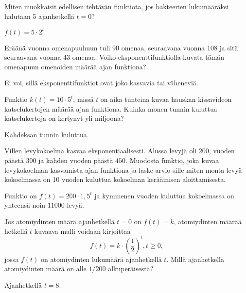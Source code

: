\begin{tehtavasivu}
\begin{tehtava}
Miten muokkaisit edellisen tehtävän funktiota, jos bakteerien lukumääräksi
halutaan 5 ajanhetkellä $t = 0$?
\begin{vastaus}
$f(t) = 5 \cdot 2^t$
\end{vastaus}
\end{tehtava}

\begin{tehtava}
Eräänä vuonna omenapuuhuun tuli 90 omenaa, seuraavana vuonna 108 ja sitä seuraavana vuonna 43 omenaa. Voiko eksponenttifunktiolla kuvata tämän omenapuun omenoiden määrää ajan funktiona?
\begin{vastaus}
Ei voi, sillä eksponenttifunktiot ovat joko kasvavia tai väheneviä.
\end{vastaus}
\end{tehtava}

\begin{tehtava}
Funktio $k(t) = 10 \cdot 5^t$, missä $t$ on aika tunteina kuvaa hauskan kissavideon katselukertojen määrää ajan funktiona. Kuinka monen tunnin kuluttua katselukertoja on kertynyt yli miljoona?
\begin{vastaus}
Kahdeksan tunnin kuluttua.
\end{vastaus}
\end{tehtava}

\begin{tehtava}
Villen levykokoelma kasvaa eksponentiaalisesti. Alussa levyjä oli $ 200 $, vuoden päästä $ 300 $ ja kahden vuoden päästä $ 450 $. Muodosta funktio, joka kuvaa levykokoelman kasvamista ajan funktiona ja laske arvio sille miten monta levyä kokoelmassa on 10 vuoden kuluttua kokoelman keräämisen aloittamisesta.
\begin{vastaus}
Funktio on $f(t) = 200 \cdot 1,5^t$ ja kymmenen vuoden kuluttua kokoelmassa on yhteensä noin $11000$ levyä.
\end{vastaus}
\end{tehtava}

\begin{tehtava}
Jos atomiydinten määrä ajanhetkellä
$t = 0$ on $f(t) = k$, atomiydinten määrää hetkellä $ t $ kuvaava 
malli voidaan kirjoittaa
\[
f(t) = k \cdot \left( \frac{1}{2} \right)^t, t \ge 0,
\]
jossa $f(t)$ on atomiydinten lukumäärä ajanhetkellä $t$.
Millä ajanhetkellä atomiydinten määrä on alle $1/200$ alkuperäisestä?
\begin{vastaus}
Ajanhetkellä $t = 8$.
\end{vastaus}
\end{tehtava}


\end{tehtavasivu}
